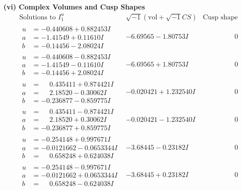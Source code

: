 \documentclass[1p]{elsarticle_modified}
\theoremstyle{definition}
\newcommand{\I}{\sqrt{-1}}
\begin{document}
\newpage\flushleft \textbf{(vi) Complex Volumes and Cusp Shapes}
$$\begin{array}{c|c|c}  
\text{Solutions to }I^u_{1}& \I (\text{vol} + \sqrt{-1}CS) & \text{Cusp shape}\\
 \hline 
\begin{aligned}
u &= -0.440608 + 0.882453 I \\
a &= -1.41549 + 0.11610 I \\
b &= -0.14456 - 2.08024 I\end{aligned}
 & -6.69565 - 1.80753 I & \phantom{-0.000000 } 0 \\ \hline\begin{aligned}
u &= -0.440608 - 0.882453 I \\
a &= -1.41549 - 0.11610 I \\
b &= -0.14456 + 2.08024 I\end{aligned}
 & -6.69565 + 1.80753 I & \phantom{-0.000000 } 0 \\ \hline\begin{aligned}
u &= \phantom{-}0.435411 + 0.874421 I \\
a &= \phantom{-}2.18520 - 0.30062 I \\
b &= -0.236877 - 0.859775 I\end{aligned}
 & -0.020421 + 1.232540 I & \phantom{-0.000000 } 0 \\ \hline\begin{aligned}
u &= \phantom{-}0.435411 - 0.874421 I \\
a &= \phantom{-}2.18520 + 0.30062 I \\
b &= -0.236877 + 0.859775 I\end{aligned}
 & -0.020421 - 1.232540 I & \phantom{-0.000000 } 0 \\ \hline\begin{aligned}
u &= -0.254148 + 0.997671 I \\
a &= -0.0121662 - 0.0653344 I \\
b &= \phantom{-}0.658248 + 0.624038 I\end{aligned}
 & -3.68445 - 0.23182 I & \phantom{-0.000000 } 0 \\ \hline\begin{aligned}
u &= -0.254148 - 0.997671 I \\
a &= -0.0121662 + 0.0653344 I \\
b &= \phantom{-}0.658248 - 0.624038 I\end{aligned}
 & -3.68445 + 0.23182 I & \phantom{-0.000000 } 0 \\ \hline\begin{aligned}

\end{aligned}
\end{array}$$
\end{document}

